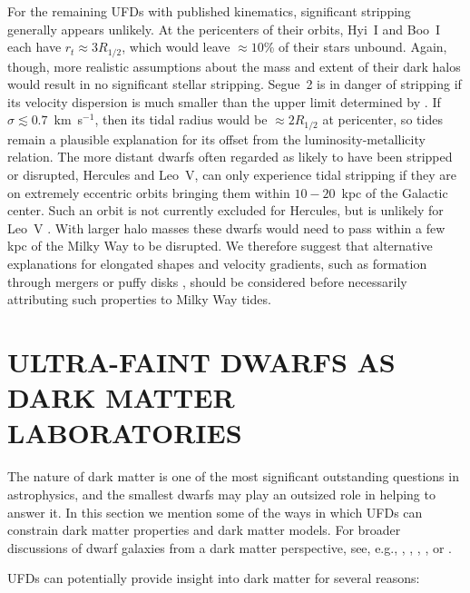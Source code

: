 \documentclass[a4paper]{ar-1col}
\newcommand{\kms}         {km~s$^{-1}$}
\begin{document}
For the remaining UFDs with published kinematics, significant
stripping generally appears unlikely.  At the pericenters of their
orbits, Hyi~I and Boo~I each have $r_{t} \approx 3 R_{1/2}$, which
would leave $\approx10$\% of their stars unbound.  Again, though, more
realistic assumptions about the mass and extent of their dark halos
would result in no significant stellar stripping.  Segue~2 is in
danger of stripping if its velocity dispersion is much smaller than
the upper limit determined by \citet{kirby13}.  If $\sigma \lesssim
0.7$~\kms, then its tidal radius would be $\approx 2 R_{1/2}$ at
pericenter, so tides remain a plausible explanation for its offset
from the luminosity-metallicity relation.  The more distant dwarfs
often regarded as likely to have been stripped or disrupted, Hercules
and Leo~V, can only experience tidal stripping if they are on
extremely eccentric orbits bringing them within $10-20$~kpc of the
Galactic center.  Such an orbit is not currently excluded for
Hercules, but is unlikely for Leo~V \citep{fritz18}.  With larger halo
masses these dwarfs would need to pass within a few kpc of the Milky
Way to be disrupted.  We therefore suggest that alternative
explanations for elongated shapes and velocity gradients, such as
formation through mergers or puffy disks
\citep[e.g.,][]{starkenburg16,wheeler17}, should be considered before
necessarily attributing such properties to Milky Way tides.


\section{ULTRA-FAINT DWARFS AS DARK MATTER LABORATORIES}
\label{sec:dm}

The nature of dark matter is one of the most significant outstanding
questions in astrophysics, and the smallest dwarfs may play an
outsized role in helping to answer it.  In this section we mention
some of the ways in which UFDs can constrain dark matter properties
and dark matter models.  For broader discussions of dwarf galaxies
from a dark matter perspective, see, e.g., \citet{porter13},
\citet{weinberg15}, \citet{bbk17}, \citet{bp17}, or
\citet{strigari18}.

UFDs can potentially provide insight into dark matter for several
reasons:
\end{document}
